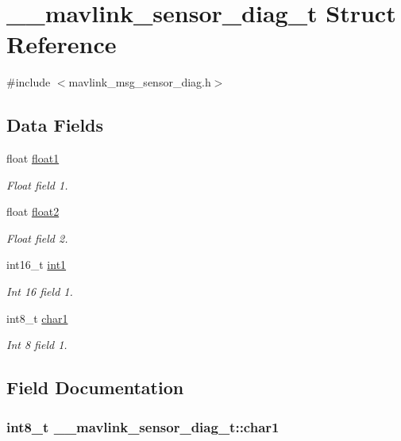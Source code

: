 \hypertarget{struct____mavlink__sensor__diag__t}{\section{\+\_\+\+\_\+mavlink\+\_\+sensor\+\_\+diag\+\_\+t Struct Reference}
\label{struct____mavlink__sensor__diag__t}
}


{\ttfamily \#include $<$mavlink\+\_\+msg\+\_\+sensor\+\_\+diag.\+h$>$}

\subsection*{Data Fields}
\begin{DoxyCompactItemize}
\item 
float \hyperlink{struct____mavlink__sensor__diag__t_a03cc21136fba58b900332f477e913046}{float1}
\begin{DoxyCompactList}\small\item\em Float field 1. \end{DoxyCompactList}\item 
float \hyperlink{struct____mavlink__sensor__diag__t_ac12ea4978b29417ad511f8bce68438f2}{float2}
\begin{DoxyCompactList}\small\item\em Float field 2. \end{DoxyCompactList}\item 
int16\+\_\+t \hyperlink{struct____mavlink__sensor__diag__t_a9b6d200beb992b957e608b6d6276f6bf}{int1}
\begin{DoxyCompactList}\small\item\em Int 16 field 1. \end{DoxyCompactList}\item 
int8\+\_\+t \hyperlink{struct____mavlink__sensor__diag__t_a5e0881d071a32c184c15da361fc48198}{char1}
\begin{DoxyCompactList}\small\item\em Int 8 field 1. \end{DoxyCompactList}\end{DoxyCompactItemize}


\subsection{Field Documentation}
\hypertarget{struct____mavlink__sensor__diag__t_a5e0881d071a32c184c15da361fc48198}{
\subsubsection[{char1}]{\setlength{\rightskip}{0pt plus 5cm}int8\+\_\+t \+\_\+\+\_\+mavlink\+\_\+sensor\+\_\+diag\+\_\+t\+::char1}}\label{struct____mavlink__sensor__diag__t_a5e0881d071a32c184c15da361fc48198}


